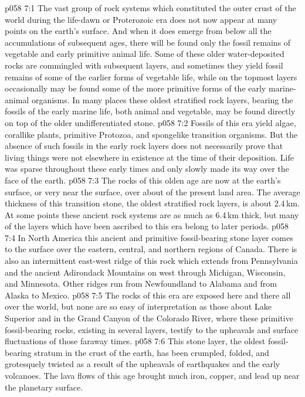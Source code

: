 \vs p058 7:1 The vast group of rock systems which constituted the outer crust of the world during the life\hyp{}dawn or Proterozoic era does not now appear at many points on the earth’s surface. And when it does emerge from below all the accumulations of subsequent ages, there will be found only the fossil remains of vegetable and early primitive animal life. Some of these older water\hyp{}deposited rocks are commingled with subsequent layers, and sometimes they yield fossil remains of some of the earlier forms of vegetable life, while on the topmost layers occasionally may be found some of the more primitive forms of the early marine\hyp{}animal organisms. In many places these oldest stratified rock layers, bearing the fossils of the early marine life, both animal and vegetable, may be found directly on top of the older undifferentiated stone.
\vs p058 7:2 Fossils of this era yield algae, corallike plants, primitive Protozoa, and spongelike transition organisms. But the absence of such fossils in the early rock layers does not necessarily prove that living things were not elsewhere in existence at the time of their deposition. Life was sparse throughout these early times and only slowly made its way over the face of the earth.
\vs p058 7:3 \pc The rocks of this olden age are now at the earth’s surface, or very near the surface, over about  of the present land area. The average thickness of this transition stone, the oldest stratified rock layers, is about 2.4\,km. At some points these ancient rock systems are as much as 6.4\,km thick, but many of the layers which have been ascribed to this era belong to later periods.
\vs p058 7:4 In North America this ancient and primitive fossil\hyp{}bearing stone layer comes to the surface over the eastern, central, and northern regions of Canada. There is also an intermittent east\hyp{}west ridge of this rock which extends from Pennsylvania and the ancient Adirondack Mountains on west through Michigan, Wisconsin, and Minnesota. Other ridges run from Newfoundland to Alabama and from Alaska to Mexico.
\vs p058 7:5 The rocks of this era are exposed here and there all over the world, but none are so easy of interpretation as those about Lake Superior and in the Grand Canyon of the Colorado River, where these primitive fossil\hyp{}bearing rocks, existing in several layers, testify to the upheavals and surface fluctuations of those faraway times.
\vs p058 7:6 This stone layer, the oldest fossil\hyp{}bearing stratum in the crust of the earth, has been crumpled, folded, and grotesquely twisted as a result of the upheavals of earthquakes and the early volcanoes. The lava flows of this age brought much iron, copper, and lead up near the planetary surface.
